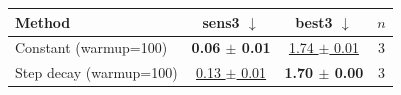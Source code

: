\begin{tabular}{lccc}
\toprule
Method & sens3 $\downarrow$ & best3 $\downarrow$ & $n$ \\
\midrule
Constant (warmup=100) & \textbf{0.06 $\pm$ 0.01} & \underline{1.74 $\pm$ 0.01} & 3 \\
Step decay (warmup=100) & \underline{0.13 $\pm$ 0.01} & \textbf{1.70 $\pm$ 0.00} & 3 \\
\bottomrule
\end{tabular}
